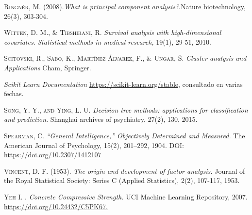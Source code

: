 \begin{thebibliography}{99}

\textsc{Ringnér, M. (2008).}\emph{What is principal component analysis?}.Nature biotechnology, 26(3), 303-304.

\textsc{Witten, D. M., \& Tibshirani, R. } \emph{Survival analysis with high-dimensional covariates}. \emph{Statistical methods in medical research,} 19(1), 29-51, 2010.

\textsc{Scitovski, R., Sabo, K., Martínez-Álvarez, F., \& Ungar, Š. } \emph{Cluster analysis and Applications} Cham, Springer.

 \textit{Scikit Learn Documentation} \url{https://scikit-learn.org/stable}, consultado en varias fechas. 

\textsc{Song, Y. Y., and Ying, L. U. } \emph{Decision tree methods: applications for classification and prediction}. Shanghai archives of psychiatry, 27(2), 130, 2015.

\textsc{Spearman, C.} \emph{“General Intelligence,” Objectively Determined and Measured.} The American Journal of Psychology, 15(2), 201–292, 1904. DOI: \url{https://doi.org/10.2307/1412107}

\textsc{Vincent, D. F. (1953).} \emph{The origin and development of factor analysis.} Journal of the Royal Statistical Society: Series C (Applied Statistics), 2(2), 107-117, 1953.



\textsc{Yeh I. }. \emph{Concrete Compressive Strength.} UCI Machine Learning Repository, 2007. \url{https://doi.org/10.24432/C5PK67.}

\end{thebibliography}
 